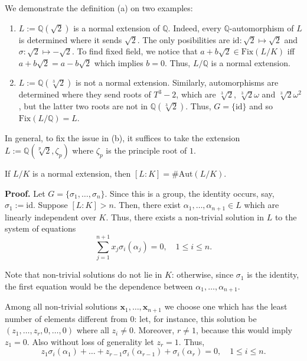 \documentclass{template}
\begin{document}
\begin{example}
    We demonstrate the definition (a) on two examples:
    \begin{enumerate}
        \item[(a)] $L := \mathbb{Q}(\sqrt{2})$ is a normal extension of $\mathbb{Q}$. Indeed,
    every $\mathbb{Q}$-automorphism of $L$ is determined where it sends
    $\sqrt{2}$. The only posibilities are $\text{id}: \sqrt{2} \mapsto \sqrt{2}$
    and $\sigma: \sqrt{2} \mapsto -\sqrt{2}$. To find fixed field, we notice
    that $a+b\sqrt{2} \in \text{Fix}(L/K)$ iff $a+b\sqrt{2}=a-b\sqrt{2}$ which
    implies $b=0$. Thus, $L/\mathbb{Q}$ is a normal extension.
        \item[(b)] $L:=\mathbb{Q}(\sqrt[3]{2})$ is not a normal extension.
        Similarly, automorphisms are determined where they send roots of
        $T^3-2$, which are $\sqrt[3]{2}$, $\sqrt[3]{2}\omega$ and
        $\sqrt[3]{2}\omega^2$, but the latter two roots are not in
        $\mathbb{Q}(\sqrt[3]{2})$. Thus, $G=\{\text{id}\}$ and so
        $\text{Fix}(L/\mathbb{Q})=L$.
    \end{enumerate}

    In general, to fix the issue in (b), it suffices to take the extension $L :=
    \mathbb{Q}(\sqrt[p]{2}, \zeta_p)$ where $\zeta_p$ is the principle root of
    $1$.
\end{example}

\begin{theorem}
    If $L/K$ is a normal extension, then $[L:K] = \#\text{Aut}(L/K)$.
\end{theorem}

\textbf{Proof.} Let $G=\{\sigma_1,\dots,\sigma_n\}$. Since this is a group, the
identity occurs, say, $\sigma_1 := \text{id}$. Suppose $[L:K]>n$. Then, there
exist $\alpha_1,\dots,\alpha_{n+1} \in L$ which are linearly independent over
$K$. Thus, there exists a non-trivial solution in $L$ to the system of equations
\begin{equation*}
    \sum_{j=1}^{n+1}x_j\sigma_i(\alpha_j) = 0, \quad 1 \leq i \leq n.
\end{equation*}

Note that non-trivial solutions do not lie in $K$: otherwise, since $\sigma_1$
is the identity, the first equation would be the dependence between
$\alpha_1,\dots,\alpha_{n+1}$. 

Among all non-trivial solutions $\mathbf{x}_1,\dots,\mathbf{x}_{n+1}$ we choose
one which has the least number of elements different from $0$: let, for
instance, this solution be $(z_1,\dots,z_r,0,\dots,0)$ where all $z_i \neq 0$.
Moreover, $r \neq 1$, because this would imply $z_1=0$. Also without 
loss of generality let $z_r=1$. Thus,
\begin{equation*}
    z_1\sigma_i(\alpha_1) + \dots + z_{r-1}\sigma_i(\alpha_{r-1}) + \sigma_i(\alpha_r) = 0, \quad 1 \leq i \leq n.
\end{equation*}
\end{document}
